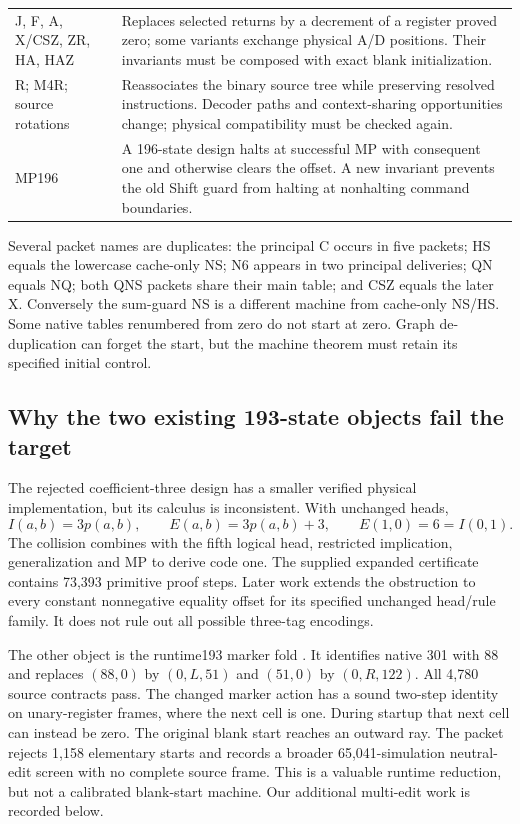 \begin{longtable}{@{}p{}p{}@{}}
J, F, A, X/CSZ, ZR, HA, HAZ & Replaces selected returns by a decrement of a register proved zero; some variants exchange physical A/D positions. Their invariants must be composed with exact blank initialization.\\[4pt]
R; M4R; source rotations & Reassociates the binary source tree while preserving resolved instructions. Decoder paths and context-sharing opportunities change; physical compatibility must be checked again.\\[4pt]
MP196 & A 196-state design halts at successful MP with consequent one and otherwise clears the offset. A new invariant prevents the old Shift guard from halting at nonhalting command boundaries.\\
\bottomrule
\end{longtable}\endgroup

Several packet names are duplicates: the principal C occurs in five
packets; HS equals the lowercase cache-only NS; N6 appears in two principal
deliveries; QN equals NQ; both QNS packets share their main table; and CSZ
equals the later X. Conversely the sum-guard NS is a different machine
from cache-only NS/HS. Some native tables renumbered from zero do not start
at zero. Graph de-duplication can forget the start, but the machine theorem
must retain its specified initial control.

\subsection{Why the two existing 193-state objects fail the target}

The rejected coefficient-three design has a smaller verified physical
implementation, but its calculus is inconsistent. With unchanged heads,
\[
 I(a,b)=3p(a,b),\qquad E(a,b)=3p(a,b)+3,
 \qquad E(1,0)=6=I(0,1).
\]
The collision combines with the fifth logical head, restricted implication,
generalization and MP to derive code one. The supplied expanded certificate
contains 73,393 primitive proof steps. Later work extends the obstruction
to every constant nonnegative equality offset for its specified unchanged
head/rule family. It does not rule out all possible three-tag encodings.

The other object is the runtime193 marker fold \cite{runtime193}.
It identifies native 301 with 88 and replaces
$(88,0)$ by $(0,L,51)$ and $(51,0)$ by $(0,R,122)$.
All 4,780 source contracts pass. The changed marker action has a sound
two-step identity on unary-register frames, where the next cell is one.
During startup that next cell can instead be zero. The original blank
start reaches an outward ray. The packet rejects 1,158 elementary starts
and records a broader 65,041-simulation neutral-edit screen with no complete
source frame. This is a valuable runtime reduction, but not a calibrated
blank-start machine. Our additional multi-edit work is recorded below.

